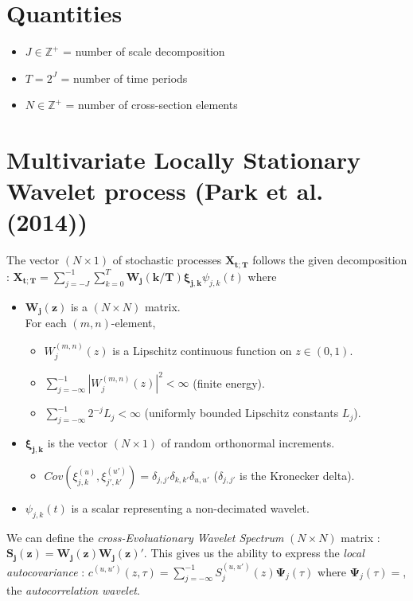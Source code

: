 \documentclass{article}
\let \oldsum \sum
\renewcommand{\sum}{\displaystyle \oldsum}
\newcommand{\abs}[1]{\left \lvert #1 \right \rvert}
\newcommand{\X}[1]{\bm{X_{#1;T}}}
\newcommand{\W}[2]{\bm{W_{#1}\left(#2/T\right)}}
\newcommand{\wavelet}[3]{\psi_{#1,#2}(#3)}
\newcommand{\ACwavelet}[2]{\bm{\Psi}_{#1}(#2)}
\newcommand{\increment}[2]{\bm{\xi_{#1,#2}}}
\newcommand{\eincrement}[3]{\xi_{#2,#3}^{(#1)}}
\newcommand{\scalesum}{\sum_{j=-J}^{-1}}
\newcommand{\locsum}{\sum_{k=0}^{T}}
\newcommand{\kronecker}[2]{\delta_{#1,#2}}
\begin{document}
	\section{Quantities}
		\begin{itemize}
			\item $J \in \mathbb{Z}^{+}$ = number of scale decomposition
			\item $T = 2^{J}$ = number of time periods 
			\item $N \in \mathbb{Z}^{+}$ = number of cross-section elements
		\end{itemize}

	\section{Multivariate Locally Stationary Wavelet process (Park et al. (2014))}
		The vector $(N \times 1)$ of stochastic processes $\X{t}$ follows the given decomposition : 
		$ \X{t} = \scalesum \locsum \W{j}{k} \increment{j}{k} \wavelet{j}{k}{t} $ 
		where 
		\begin{itemize}
			\item $\bm{W_{j}(z)}$ is a $(N \times N)$ matrix. \\ 
				For each $(m,n)$-element, 
				\begin{itemize}
					\item $W_{j}^{(m,n)}(z)$ is a Lipschitz continuous function on $z \in (0,1)$.
					\item $\sum_{j=-\infty}^{-1} \abs{W_{j}^{(m,n)}(z)}^{2} < \infty$ (finite energy).
					\item $\sum_{j=-\infty}^{-1} 2^{-j}L_{j} < \infty$ (uniformly bounded Lipschitz constants $L_{j}$).
				\end{itemize}
			\item $\increment{j}{k}$ is the vector $(N \times 1)$ of random orthonormal increments.
				\begin{itemize}
					\item $Cov(\eincrement{u}{j}{k}, \eincrement{u'}{j'}{k'}) = \kronecker{j}{j'}\kronecker{k}{k'}\kronecker{u}{u'}$ ($\kronecker{j}{j'}$ is the Kronecker delta).
				\end{itemize}
			\item $\wavelet{j}{k}{t}$ is a scalar representing a non-decimated wavelet.
		\end{itemize}

We can define the \emph{cross-Evoluationary Wavelet Spectrum} $(N \times N)$ matrix : $\bm{S_{j}(z)} = \bm{W_{j}(z)}\bm{W_{j}(z)}'$.
This gives us the ability to express the \emph{local autocovariance} : $c^{(u,u')}(z,\tau) = \sum_{j=-\infty}^{-1} S_{j}^{(u,u')}(z) \ACwavelet{j}{\tau}$ where $\ACwavelet{j}{\tau} = $, the \emph{autocorrelation wavelet}.
\end{document}
